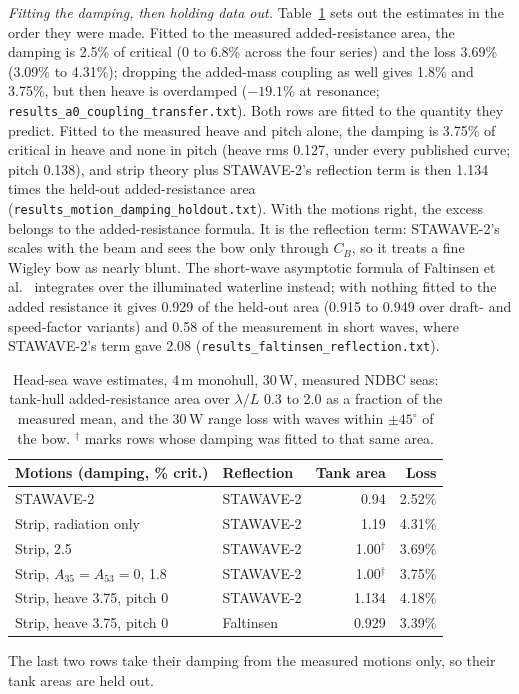 \documentclass[conference]{IEEEtran}
\begin{document}
\emph{Fitting the damping, then holding data out.} Table~\ref{tab:waves} sets out the estimates in the order they were made. Fitted to the measured added-resistance area, the damping is 2.5\% of critical (0 to 6.8\% across the four series) and the loss 3.69\% (3.09\% to 4.31\%); dropping the added-mass coupling as well gives 1.8\% and 3.75\%, but then heave is overdamped ($-19.1$\% at resonance; \texttt{results\_a0\_coupling\_transfer.txt}). Both rows are fitted to the quantity they predict. Fitted to the measured heave and pitch alone, the damping is 3.75\% of critical in heave and none in pitch (heave rms 0.127, under every published curve; pitch 0.138), and strip theory plus STAWAVE-2's reflection term is then 1.134 times the held-out added-resistance area (\texttt{results\_motion\_damping\_holdout.txt}). With the motions right, the excess belongs to the added-resistance formula. It is the reflection term: STAWAVE-2's scales with the beam and sees the bow only through $C_B$, so it treats a fine Wigley bow as nearly blunt. The short-wave asymptotic formula of Faltinsen et al.~\cite{faltinsen1980prediction} integrates over the illuminated waterline instead; with nothing fitted to the added resistance it gives 0.929 of the held-out area (0.915 to 0.949 over draft- and speed-factor variants) and 0.58 of the measurement in short waves, where STAWAVE-2's term gave 2.08 (\texttt{results\_faltinsen\_reflection.txt}).

\begin{table}[t]
\centering
\caption{Head-sea wave estimates, 4\,m monohull, 30\,W, measured NDBC seas: tank-hull added-resistance area over $\lambda/L$ 0.3 to 2.0 as a fraction of the measured mean, and the 30\,W range loss with waves within $\pm45^\circ$ of the bow. $^{\dagger}$ marks rows whose damping was fitted to that same area.}
\label{tab:waves}
\small
\begin{tabular}{@{}llrr@{}}
\toprule
Motions (damping, \% crit.) & Reflection & Tank area & Loss \\
\midrule
STAWAVE-2 & STAWAVE-2 & 0.94 & 2.52\% \\
Strip, radiation only & STAWAVE-2 & 1.19 & 4.31\% \\
Strip, 2.5 & STAWAVE-2 & 1.00$^{\dagger}$ & 3.69\% \\
Strip, $A_{35}{=}A_{53}{=}0$, 1.8 & STAWAVE-2 & 1.00$^{\dagger}$ & 3.75\% \\
Strip, heave 3.75, pitch 0 & STAWAVE-2 & 1.134 & 4.18\% \\
Strip, heave 3.75, pitch 0 & Faltinsen & 0.929 & 3.39\% \\
\bottomrule
\end{tabular}

\smallskip
{\footnotesize The last two rows take their damping from the measured motions only, so their tank areas are held out.}
\end{table}
\end{document}
